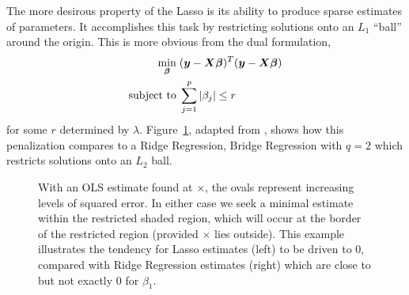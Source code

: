 \documentclass{uwstat572}
\begin{document}
The more desirous property of the Lasso is its ability to produce sparse estimates of parameters. It accomplishes this task by restricting solutions onto an $L_1$ ``ball'' around the origin. This is more obvious from the dual formulation, 
\begin{align*}
\min_{\boldsymbol{\beta}}  \hspace{.1cm} &(\boldsymbol{y}-\boldsymbol{X}\boldsymbol{\beta})^T(\boldsymbol{y}-\boldsymbol{X}\boldsymbol{\beta})\\
\text{subject to} \hspace{.1cm}&\sum_{j=1}^p|\beta_j|\leq r
\end{align*}
for some $r$ determined by $\lambda$. Figure~\ref{LassoPlot}, adapted from \cite{park2008bayesian}, shows how this penalization compares to a Ridge Regression, Bridge Regression with $q=2$ which restricts solutions onto an $L_2$ ball.

\begin{figure}\label{LassoPlot}
  \centering
  \caption{With an OLS estimate found at $\times$, the ovals represent increasing levels of squared error. In either case we seek a minimal estimate within the restricted shaded region, which will occur at the border of the restricted region (provided $\times$ lies outside). This example illustrates the tendency for Lasso estimates (left) to be driven to 0, compared with Ridge Regression estimates (right) which are close to but not exactly 0 for $\beta_1$.}
\end{figure}
\end{document}
